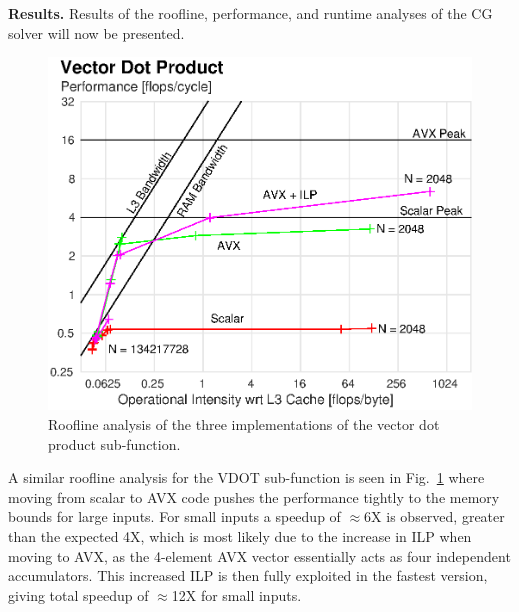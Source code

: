 \documentclass[letterpaper]{article}
\newcommand{\mypar}[1]{{\bf #1.}}
\begin{document}
\mypar{Results}
Results of the roofline, performance, and runtime analyses of the CG solver will now be presented.

%

\begin{figure}\centering
  \includegraphics[scale=0.67]{./plots/roofline_vdot.eps}
  \caption{Roofline analysis of the three implementations of the vector dot product sub-function.\label{roofline_vdot}}
\end{figure}

A similar roofline analysis for the VDOT sub-function is seen in Fig.~\ref{roofline_vdot} where moving from scalar to AVX code pushes the performance tightly to the memory bounds for large inputs. For small inputs a speedup of $\approx$6X is observed, greater than the expected 4X, which is most likely due to the increase in ILP when moving to AVX, as the 4-element AVX vector essentially acts as four independent accumulators. This increased ILP is then fully exploited in the fastest version, giving total speedup of $\approx$12X for small inputs.
\end{document}
